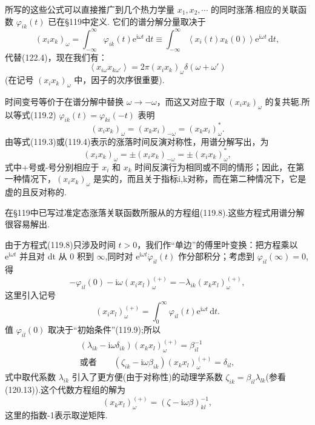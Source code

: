 所写的这些公式可以直接推广到几个热力学量 $x_1,x_2,\cdots$ 的同时涨落.相应的关联函数 $\varphi_{ik}(t)$ 已在§119中定义. 它们的谱分解分量取决于
\begin{equation}
  (x_ix_k)_\omega=\int_{-\infty}^{\infty}\varphi_{ik}(t)\mathrm{e}^{\mathrm{i}\omega t}\,\mathrm{d}t
  \equiv\int_{-\infty}^{\infty}\left\langle x_i(t)x_k(0)\right\rangle
  \mathrm{e}^{\mathrm{i}\omega t}\,\mathrm{d}t,
\end{equation}
代替(122.4)，现在我们有：
\begin{equation}
  \left\langle x_{i\omega}x_{k\omega'}\right\rangle
  =2\pi(x_ix_k)_\omega\delta(\omega+\omega')
\end{equation}
(在记号 $(x_ix_k)_\omega$ 中，因子的次序很重要).

时间变号等价于在谱分解中替换 $\omega\to-\omega$，而这又对应于取 $(x_ix_k)_\omega$ 的复共轭.所以等式(119.2) $\varphi_{ik}(t)=\varphi_{ki}(-t)$ 表明
\begin{equation}
  (x_ix_k)_\omega=(x_kx_i)_{-\omega}=(x_kx_i)_\omega^*.
\end{equation}
由等式(119.3)或(119.4)表示的涨落时间反演对称性，用谱分解写出，为
\begin{equation}
  (x_ix_k)_\omega=\pm(x_ix_k)_{-\omega}=\pm(x_ix_k)_\omega^*,
\end{equation}
式中+号或-号分别相应于 $x_i$ 和 $x_k$ 时间反演行为相同或不同的情形；因此，在第一种情况下，$(x_ix_k)_\omega$ 是实的，而且关于指标i,k对称，而在第二种情况下，它是虚的且反对称的.

在§119中已写过准定态涨落关联函数所服从的方程组(119.8).这些方程式用谱分解很容易解出.

由于方程式(119.8)只涉及时间 $t>0$，我们作“单边”的傅里叶变换：把方程乘以 $\mathrm{e}^{\mathrm{i}\omega t}$ 并且对 dt 从 0 积到 $\infty$,同时对 $\mathrm{e}^{\mathrm{i}\omega t}\dot{\varphi}_{il}(t)$ 作分部积分；考虑到 $\varphi_{il}(\infty)=0$,得
\begin{equation*}
  -\varphi_{il}(0)-\mathrm{i}\omega(x_ix_l)_\omega^{(+)}
  =-\lambda_{ik}(x_kx_l)_\omega^{(+)},
\end{equation*}
这里引入记号
\begin{equation}
  (x_ix_l)_\omega^{(+)}=\int_0^{\infty}\varphi_{il}(t)\mathrm{e}^{\mathrm{i}\omega t}\,\mathrm{d}t.
\end{equation}
值 $\varphi_{il}(0)$ 取决于“初始条件”(119.9);所以
\begin{equation*}
\begin{gathered}
  (\lambda_{ik}-\mathrm{i}\omega\delta_{ik})(x_kx_l)_\omega^{(+)}
  =\beta^{-1}_{il}\\
  \text{或者}\qquad
  (\zeta_{ik}-\mathrm{i}\omega\beta_{ik})(x_kx_l)_\omega^{(+)}
  =\delta_{il},
\end{gathered}
\end{equation*}
式中取代系数 $\lambda_{ik}$ 引入了更方便(由于对称性)的动理学系数 $\zeta_{ik}=\beta_{il}\lambda_{lk}$(参看(120.13)).这个代数方程组的解为
\begin{equation*}
  (x_kx_l)_\omega^{(+)}=(\zeta-\mathrm{i}\omega\beta)^{-1}_{kl},
\end{equation*}
这里的指数-1表示取逆矩阵.

